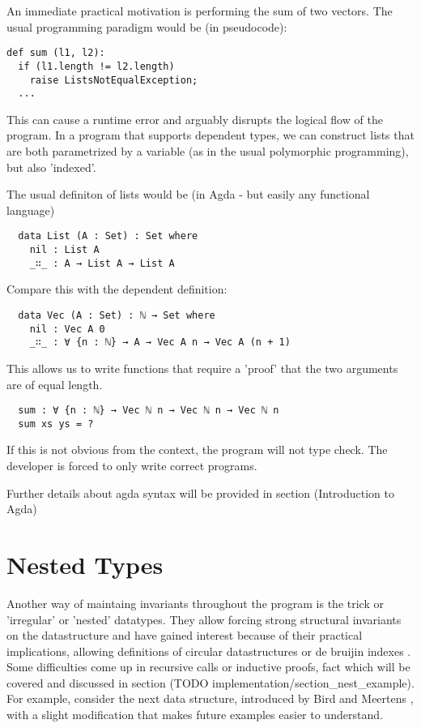 \documentclass[12pt,twoside,notitlepage]{report}
\begin{document}
An immediate practical motivation is performing the sum of two vectors.
The usual programming paradigm would be (in pseudocode): \\

\begin{verbatim}
def sum (l1, l2):
  if (l1.length != l2.length)
    raise ListsNotEqualException;
  ...
\end{verbatim}

This can cause a runtime error and arguably disrupts the logical flow of the program. In a program that
supports dependent types, we can construct lists that are both parametrized by a variable (as in the usual
polymorphic programming), but also 'indexed'.

The usual definiton of lists would be (in Agda - but easily any functional language)

\begin{verbatim}
  data List (A : Set) : Set where
    nil : List A
    _∷_ : A → List A → List A
 \end{verbatim}

Compare this with the dependent definition:

\begin{verbatim}
  data Vec (A : Set) : ℕ → Set where
    nil : Vec A 0
    _∷_ : ∀ {n : ℕ} → A → Vec A n → Vec A (n + 1)
\end{verbatim}

This allows us to write functions that require a 'proof' that the two arguments are of equal length.

\begin{verbatim}
  sum : ∀ {n : ℕ} → Vec ℕ n → Vec ℕ n → Vec ℕ n
  sum xs ys = ?
\end{verbatim}

If this is not obvious from the context, the program will not type check.
The developer is forced to only write correct programs.

Further details about agda syntax will be provided in section (Introduction to Agda)

\section{Nested Types}

Another way of maintaing invariants throughout the program is the trick or 'irregular'
or 'nested' datatypes. They allow forcing strong structural invariants on the datastructure
and have gained interest because of their practical implications, allowing definitions of
circular datastructures \cite{circular} or de bruijin indexes \cite{birdmeertens}.
Some difficulties come up in recursive calls or inductive proofs, fact which will be
covered and discussed in section (TODO implementation/section\_nest\_example).
For example, consider the next data structure, introduced by Bird and Meertens \cite{birdmeertens}
, with a slight modification that makes future examples easier to understand.
\end{document}
